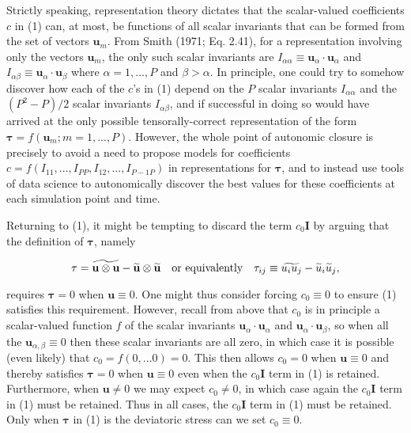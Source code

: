 Strictly speaking, representation theory dictates that the scalar-valued coefficients $c$ in (1) can, at most, be functions of all scalar invariants that can be formed from the set of vectors $\mathbf{u}_{m}$. From Smith (1971; Eq. 2.41), for a representation involving only the vectors $\mathbf{u}_{m}$, the only such scalar invariants are $I_{\alpha \alpha} \equiv \mathbf{u}_{\alpha} \cdot \mathbf{u}_{\alpha}$  and $I_{\alpha \beta} \equiv \mathbf{u}_{\alpha} \cdot \mathbf{u}_{\beta}$   where $\alpha = 1, ..., P$  and $\beta > \alpha$.  In principle, one could try to somehow discover how each of the $c$'s in (1) depend on the  $P$ scalar invariants  $I_{\alpha \alpha}$ and the  $(P^2 - P)/2$ scalar invariants $I_{\alpha \beta}$, and if successful in doing so would have arrived at the only possible tensorally-correct representation of the form $\mathbf{\tau} = f(\mathbf{u}_m; m =1,...,P)$.  However, the whole point of autonomic closure is precisely to avoid a need to propose models for coefficients $c = f(I_{11}, ... ,I_{PP}, I_{12}, ..., I_{P-1P})$  in representations for $\mathbf{\tau}$, and to instead use tools of data science to autonomically discover the best values for these coefficients at each simulation point and time. 

Returning to (1), it might be tempting to discard the term  $c_0\mathbf{I}$ by arguing that the definition of $\mathbf{\tau}$, namely

%
\begin{equation}
	\label{E:16}
	\mathbf{\tau} = \widetilde{\mathbf{u} \otimes \mathbf{u}} 
		 - \widetilde{\mathbf{u}} \otimes \widetilde{\mathbf{u}}
	\quad \textnormal{or equivalently} \quad
	\tau_{ij} \equiv \widetilde{u_i u_j} - \widetilde{u}_i \widetilde{u}_j,  
\end{equation}
%
%        

requires $\mathbf{\tau} = 0$  when $\mathbf{u} \equiv 0$. One might thus consider forcing $c_0 \equiv 0$  to ensure (1) satisfies this requirement.  However, recall from above that $c_0$  is in principle a scalar-valued function $f$  of the scalar invariants  $\mathbf{u}_{\alpha} \cdot \mathbf{u}_{\alpha}$ and $\mathbf{u}_{\alpha} \cdot \mathbf{u}_{\beta}$, so when all the  $\mathbf{u}_{\alpha, \beta} \equiv 0$ then these scalar invariants are all zero, in which case it is possible (even likely) that $c_0 = f(0,...0) = 0$.  This then allows $c_0 = 0$   when  $\mathbf{u} \equiv 0$ and thereby satisfies $\mathbf{\tau} = 0$  when  $\mathbf{u} \equiv 0$ even when the $c_0 \mathbf{I}$  term in (1) is retained.  Furthermore, when $\mathbf{u} \neq 0$  we may expect $c_0 \neq 0$, in which case again the $c_0 \mathbf{I}$ term in (1) must be retained.  Thus in all cases, the  $c_0 \mathbf{I}$ term in (1) must be retained.  Only when  $\mathbf{\tau}$ in (1) is the deviatoric stress can we set $c_0 \equiv 0$.

